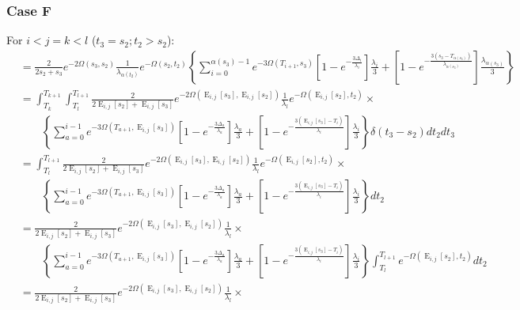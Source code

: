 \documentclass{article}
\DeclareMathOperator{\E}{E}
\begin{document}
\subsubsection{Case F}
For $i<j=k<l$ ($t_3=s_2; t_2>s_2$):
\begin{align*}
    &=\frac{2}{2s_2+s_3}e^{-2\Omega(s_3,s_2)}\frac{1}{\lambda_{\alpha(t_2)}}e^{-\Omega(s_2,t_2)}
    \left\{\sum_{i=0}^{\alpha(s_3)-1}e^{-3\Omega(T_{i+1},s_3)}
        \left[1-e^{-\frac{3\Delta_i}{\lambda_i}}\right]\frac{\lambda_i}{3}+
    \left[1-e^{-\frac{3\left(s_3-T_{\alpha(s_3)}\right)}{\lambda_{\alpha(s_3)}}}\right]
        \frac{\lambda_{\alpha(s_3)}}{3}\right\}\\
    &=\int_{T_k}^{T_{k+1}}\int_{T_l}^{T_{l+1}}
    \frac{2}{2\E_{i,j}[s_2]+\E_{i,j}[s_3]}e^{-2\Omega(\E_{i,j}[s_3],\E_{i,j}[s_2])}\frac{1}{\lambda_{l}}e^{-\Omega(\E_{i,j}[s_2],t_2)}\times\\
    &\qquad\left\{\sum_{a=0}^{i-1}e^{-3\Omega(T_{a+1},\E_{i,j}[s_3])}
        \left[1-e^{-\frac{3\Delta_a}{\lambda_a}}\right]\frac{\lambda_a}{3}+
    \left[1-e^{-\frac{3\left(\E_{i,j}[s_3]-T_{i}\right)}{\lambda_{i}}}\right]
        \frac{\lambda_{i}}{3}\right\}\delta(t_3-s_2)dt_2dt_3\\
    &=\int_{T_l}^{T_{l+1}}
    \frac{2}{2\E_{i,j}[s_2]+\E_{i,j}[s_3]}e^{-2\Omega(\E_{i,j}[s_3],\E_{i,j}[s_2])}\frac{1}{\lambda_{l}}e^{-\Omega(\E_{i,j}[s_2],t_2)}\times\\
    &\qquad\left\{\sum_{a=0}^{i-1}e^{-3\Omega(T_{a+1},\E_{i,j}[s_3])}
        \left[1-e^{-\frac{3\Delta_a}{\lambda_a}}\right]\frac{\lambda_a}{3}+
    \left[1-e^{-\frac{3\left(\E_{i,j}[s_3]-T_{i}\right)}{\lambda_{i}}}\right]
        \frac{\lambda_{i}}{3}\right\}dt_2\\
    &=
    \frac{2}{2\E_{i,j}[s_2]+\E_{i,j}[s_3]}e^{-2\Omega(\E_{i,j}[s_3],\E_{i,j}[s_2])}\frac{1}{\lambda_{l}}\times\\
    &\qquad\left\{\sum_{a=0}^{i-1}e^{-3\Omega(T_{a+1},\E_{i,j}[s_3])}
        \left[1-e^{-\frac{3\Delta_a}{\lambda_a}}\right]\frac{\lambda_a}{3}+
    \left[1-e^{-\frac{3\left(\E_{i,j}[s_3]-T_{i}\right)}{\lambda_{i}}}\right]
        \frac{\lambda_{i}}{3}\right\}
        \int_{T_l}^{T_{l+1}}e^{-\Omega(\E_{i,j}[s_2],t_2)}dt_2\\
    &=\frac{2}{2\E_{i,j}[s_2]+\E_{i,j}[s_3]}e^{-2\Omega(\E_{i,j}[s_3],\E_{i,j}[s_2])}\frac{1}{\lambda_{l}}\times\\

\end{align*}
\end{document}
